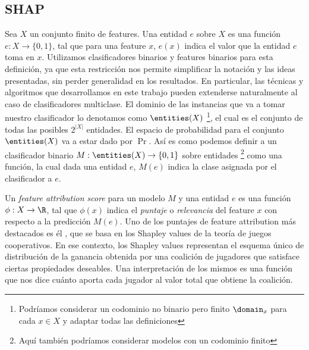 \begin{comment}
    SHAP
    Complejidad de SHAP
        Resultados previos
        ASV + Grafo Causal y Toposorts
        Nuestro objetivo era calcular ASV en tiempo polinomial en Árboles de Decisión
\end{comment}

\subsection{SHAP}


Sea $X$ un conjunto finito de features. Una entidad $e$ sobre $X$ es una función $e: X \to \{0,1\}$, tal que para una feature $x$, $e(x)$ indica el valor que la entidad $e$ toma en $x$. Utilizamos clasificadores binarios y features binarios para esta definición, ya que esta restricción nos permite simplificar la notación y las ideas presentadas, sin perder generalidad en los resultados. En particular, las técnicas y algoritmos que desarrollamos en este trabajo pueden extenderse naturalmente al caso de clasificadores multiclase. El dominio de las instancias que va a tomar nuestro clasificador lo denotamos como $\entities(X)$ \footnote{Podríamos considerar un codominio no binario pero finito $\domain_x$ para cada $x \in X$ y adaptar todas las definiciones}, el cual es el conjunto de todas las posibles $2^{|X|}$ entidades. El espacio de probabilidad para el conjunto \(\entities(X)\) va a estar dado por \(\Pr\). Así es como podemos definir a un clasificador binario $M: \entities(X) \to \{0,1\}$ sobre entidades \footnote{Aquí también podríamos considerar modelos con un codominio finito} como una función, la cual dada una entidad $e$, $M(e)$ indica la clase asignada por el clasificador a $e$. %

Un \textit{feature attribution score} para un modelo $M$ y una entidad $e$ es una función $\phi : X \to \R$, tal que $\phi(x)$ indica el \textit{puntaje} o \textit{relevancia} del feature $x$ con respecto a la predicción $M(e)$. Uno de los puntajes de feature attribution más destacados es él \SHAPscore{} \cite{shapOriginalPaper}, que se basa en los Shapley values \cite{shapley1953value} de la teoría de juegos cooperativos. En ese contexto, los Shapley values representan el esquema único de distribución de la ganancia obtenida por una coalición de jugadores que satisface ciertas propiedades deseables. Una interpretación de los mismos es una función que nos dice cuánto aporta cada jugador al valor total que obtiene la coalición. %

